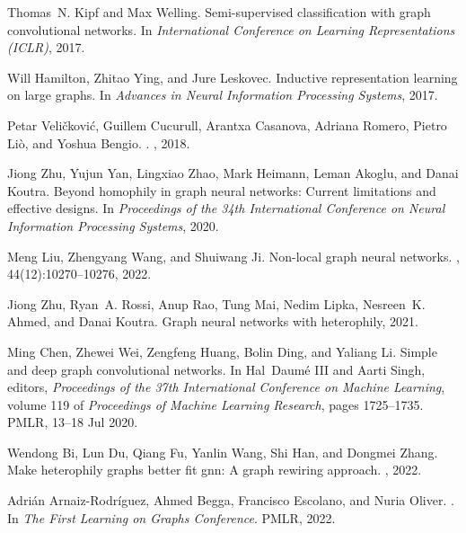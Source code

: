 \documentclass{article}
\theoremstyle{plain}
\theoremstyle{definition}
\begin{document}
\medskip


{
\small
\begin{thebibliography}{10}

Thomas~N. Kipf and Max Welling.
\newblock Semi-supervised classification with graph convolutional networks.
\newblock In {\em International Conference on Learning Representations (ICLR)},
  2017.

Will Hamilton, Zhitao Ying, and Jure Leskovec.
\newblock Inductive representation learning on large graphs.
\newblock In {\em Advances in Neural Information Processing Systems}, 2017.

Petar Veli{\v{c}}kovi{\'{c}}, Guillem Cucurull, Arantxa Casanova, Adriana
  Romero, Pietro Li{\`{o}}, and Yoshua Bengio.
.
, 2018.

Jiong Zhu, Yujun Yan, Lingxiao Zhao, Mark Heimann, Leman Akoglu, and Danai
  Koutra.
\newblock Beyond homophily in graph neural networks: Current limitations and
  effective designs.
\newblock In {\em Proceedings of the 34th International Conference on Neural
  Information Processing Systems}, 2020.

Meng Liu, Zhengyang Wang, and Shuiwang Ji.
\newblock Non-local graph neural networks.
,
  44(12):10270--10276, 2022.

Jiong Zhu, Ryan~A. Rossi, Anup Rao, Tung Mai, Nedim Lipka, Nesreen~K. Ahmed,
  and Danai Koutra.
\newblock Graph neural networks with heterophily, 2021.

Ming Chen, Zhewei Wei, Zengfeng Huang, Bolin Ding, and Yaliang Li.
\newblock Simple and deep graph convolutional networks.
\newblock In Hal~Daumé III and Aarti Singh, editors, {\em Proceedings of the
  37th International Conference on Machine Learning}, volume 119 of {\em
  Proceedings of Machine Learning Research}, pages 1725--1735. PMLR, 13--18 Jul
  2020.

Wendong Bi, Lun Du, Qiang Fu, Yanlin Wang, Shi Han, and Dongmei Zhang.
\newblock Make heterophily graphs better fit gnn: A graph rewiring approach.
, 2022.

Adri{\'a}n Arnaiz-Rodr{\'i}guez, Ahmed Begga, Francisco Escolano, and Nuria
  Oliver.
.
\newblock In {\em The First Learning on Graphs Conference}. PMLR, 2022.


\end{thebibliography}}
\end{document}
